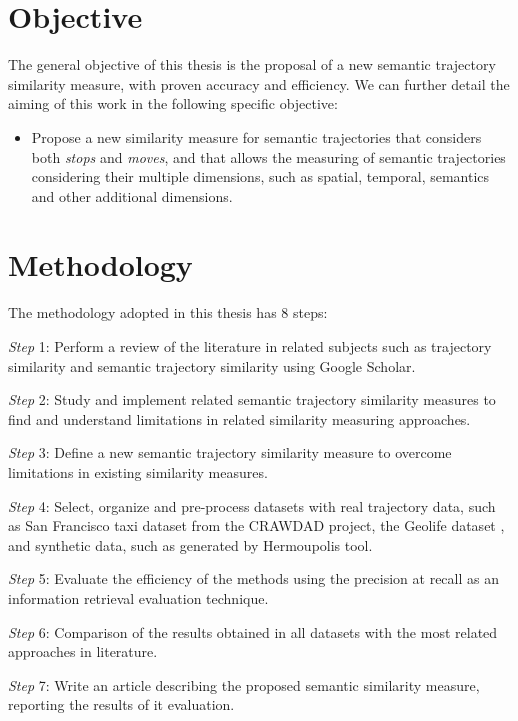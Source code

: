 \section{Objective}

The general objective of this thesis is the proposal of a new semantic trajectory similarity measure, with proven accuracy and efficiency. We can further detail the aiming of this work in the following specific objective:

\begin{itemize}
  \item Propose a new similarity measure for semantic trajectories that considers both \emph{stops} and \emph{moves}, and that allows the measuring of semantic trajectories considering their multiple dimensions, such as spatial, temporal, semantics and other additional dimensions.
\end{itemize}

\section{Methodology}
The methodology adopted in this thesis has 8 steps:

\textit{Step} 1: Perform a review of the literature in related subjects such as trajectory similarity and semantic trajectory similarity using Google Scholar.

\textit{Step} 2: Study and implement related semantic trajectory similarity measures to find and understand limitations in related similarity measuring approaches.

\textit{Step} 3: Define a new semantic trajectory similarity measure to overcome limitations in existing similarity measures.

\textit{Step} 4: Select, organize and pre-process datasets with real trajectory data, such as San Francisco taxi dataset from the CRAWDAD project\cite{epfl-mobility-20090224}, the Geolife dataset \cite{zheng2009mining}, and synthetic data, such as generated by Hermoupolis tool\cite{Pelekis-Hermoupolis}.

\textit{Step} 5: Evaluate the efficiency of the methods using the precision at recall \cite{BaezaYatesRibeiroNeto2011} as an information retrieval evaluation technique.

\textit{Step} 6: Comparison of the results obtained in all datasets with the most related approaches in literature.

\textit{Step} 7: Write an article describing the proposed semantic similarity measure, reporting the results of it evaluation.

